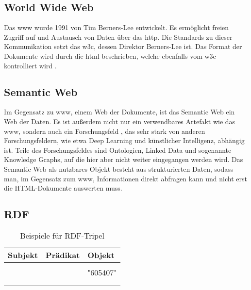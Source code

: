 \subsection{World Wide Web}
Das \ac{www} wurde 1991 von Tim Berners-Lee entwickelt.
Es ermöglicht freien Zugriff auf und Austausch von Daten über das \ac{http}.
Die Standards zu dieser Kommunikation setzt das \ac{w3c}, dessen Direktor Berners-Lee ist.
Das Format der Dokumente wird durch die \ac{html} beschrieben, welche ebenfalls vom \ac{w3c} kontrolliert wird \citep{www}.

\subsection{Semantic Web}
Im Gegensatz zu \ac{www}, einem Web der Dokumente, ist das Semantic Web ein Web der Daten.
Es ist außerdem nicht nur ein verwendbares Artefakt wie das \ac{www}, sondern auch ein Forschungsfeld \citep{semanticwebreview}, das sehr stark von anderen Forschungsfeldern, wie etwa Deep Learning und künstlicher Intelligenz, abhängig ist. Teile des Forschungsfeldes sind Ontologien, Linked Data und sogenannte Knowledge Graphs, auf die hier aber nicht weiter eingegangen werden wird.
Das Semantic Web als nutzbares Objekt besteht aus strukturierten Daten, sodass man, im Gegensatz zum \ac{www}, Informationen direkt abfragen kann und nicht erst die HTML-Dokumente auswerten muss.

\subsection{RDF}

\begin{table}[h]\centering\scriptsize
  \begin{tabulary}{\textwidth}{rcl}
    \toprule
    Subjekt & Prädikat & Objekt \\
    \midrule
     &  &  \\
     &  & "605407"  \\
     &  &  \\
     &  &  \\
    \bottomrule
  \end{tabulary}
  \caption{Beispiele für RDF-Tripel}
  \label{tab:rdftripleexample}
\end{table}

